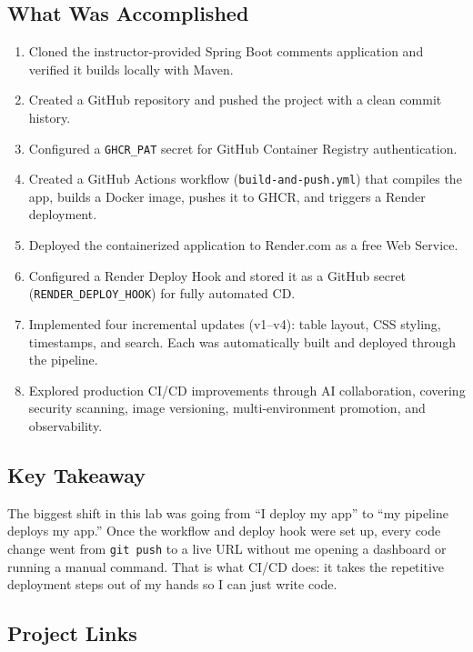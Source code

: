 \documentclass[11pt,letterpaper]{article}
\begin{document}
\subsection{What Was Accomplished}

\begin{enumerate}[nosep]
  \item Cloned the instructor-provided Spring Boot comments application and verified it builds locally with Maven.
  \item Created a GitHub repository and pushed the project with a clean commit history.
  \item Configured a \texttt{GHCR\_PAT} secret for GitHub Container Registry authentication.
  \item Created a GitHub Actions workflow (\texttt{build-and-push.yml}) that compiles the app, builds a Docker image, pushes it to GHCR, and triggers a Render deployment.
  \item Deployed the containerized application to Render.com as a free Web Service.
  \item Configured a Render Deploy Hook and stored it as a GitHub secret (\texttt{RENDER\_DEPLOY\_HOOK}) for fully automated CD.
  \item Implemented four incremental updates (v1--v4): table layout, CSS styling, timestamps, and search. Each was automatically built and deployed through the pipeline.
  \item Explored production CI/CD improvements through AI collaboration, covering security scanning, image versioning, multi-environment promotion, and observability.
\end{enumerate}

\subsection{Key Takeaway}

The biggest shift in this lab was going from ``I deploy my app'' to ``my pipeline deploys my app.'' Once the workflow and deploy hook were set up, every code change went from \texttt{git push} to a live URL without me opening a dashboard or running a manual command. That is what CI/CD does: it takes the repetitive deployment steps out of my hands so I can just write code.

\subsection{Project Links}
\end{document}
